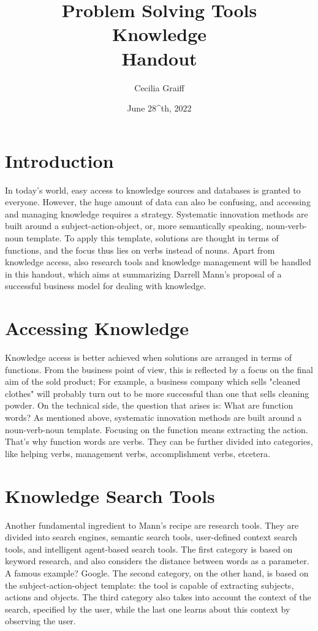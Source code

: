\documentclass{article}
\title{Problem Solving Tools \\ \textbf{Knowledge} \\ \vspace{5mm} \large Handout}
\author{Cecilia Graiff}
\date{June 28^{th}, 2022}
\begin{document}
\maketitle

\section{Introduction}
In today's world, easy access to knowledge sources and databases is granted to everyone. However, the huge amount of data can also be confusing, and accessing and managing knowledge requires a strategy. Systematic innovation methods are built around a subject-action-object, or, more semantically speaking, noun-verb-noun template. To apply this template, solutions are thought in terms of functions, and the focus thus lies on verbs instead of nouns. 
Apart from knowledge access, also research tools and knowledge management will be handled in this handout, which aims at summarizing Darrell Mann's proposal of a successful business model for dealing with knowledge.

\section{Accessing Knowledge}
Knowledge access is better achieved when solutions are arranged in terms of functions. From the business point of view, this is reflected by a focus on the final aim of the sold product; For example, a business company which sells "cleaned clothes" will probably turn out to be more successful than one that sells cleaning powder. On the technical side, the question that arises is: What are function words? As mentioned above, systematic innovation methods are built around a noun-verb-noun template. Focusing on the function means extracting the action. That's why function words are verbs. They can be further divided into categories, like helping verbs, management verbs, accomplishment verbs, etcetera.

\section{Knowledge Search Tools}
Another fundamental ingredient to Mann's recipe are research tools. They are divided into search engines, semantic search tools, user-defined context search tools, and intelligent agent-based search tools. The first category is based on keyword research, and also considers the distance between words as a parameter. A famous example? Google. The second category, on the other hand, is based on the subject-action-object template: the tool is capable of extracting subjects, actions and objects. The third category also takes into account the context of the search, specified by the user, while the last one learns about this context by observing the user.
\end{document}
